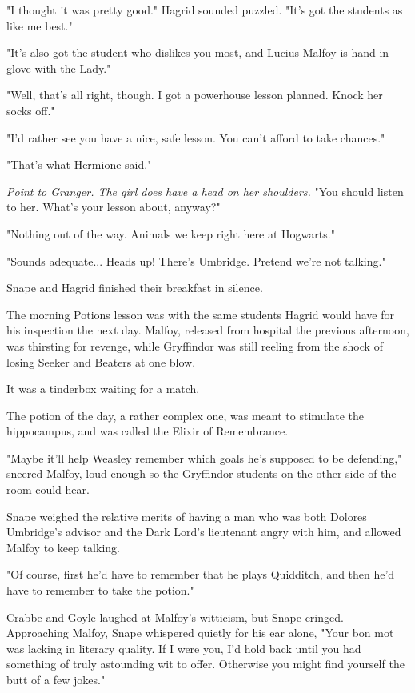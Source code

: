"I thought it was pretty good." Hagrid sounded puzzled. "It's got the students as like me best."

"It's also got the student who dislikes you most, and Lucius Malfoy is hand in glove with the Lady."

"Well, that's all right, though. I got a powerhouse lesson planned. Knock her socks off."

"I'd rather see you have a nice, safe lesson. You can't afford to take chances."

"That's what Hermione said."

\emph{Point to Granger. The girl does have a head on her shoulders.} "You should listen to her. What's your lesson about, anyway?"

"Nothing out of the way. Animals we keep right here at Hogwarts."

"Sounds adequate... Heads up! There's Umbridge. Pretend we're not talking."

Snape and Hagrid finished their breakfast in silence.

The morning Potions lesson was with the same students Hagrid would have for his inspection the next day. Malfoy, released from hospital the previous afternoon, was thirsting for revenge, while Gryffindor was still reeling from the shock of losing Seeker and Beaters at one blow.

It was a tinderbox waiting for a match.

The potion of the day, a rather complex one, was meant to stimulate the hippocampus, and was called the Elixir of Remembrance.

"Maybe it'll help Weasley remember which goals he's supposed to be defending," sneered Malfoy, loud enough so the Gryffindor students on the other side of the room could hear.

Snape weighed the relative merits of having a man who was both Dolores Umbridge's advisor and the Dark Lord's lieutenant angry with him, and allowed Malfoy to keep talking.

"Of course, first he'd have to remember that he plays Quidditch, and then he'd have to remember to take the potion."

Crabbe and Goyle laughed at Malfoy's witticism, but Snape cringed. Approaching Malfoy, Snape whispered quietly for his ear alone, "Your bon mot was lacking in literary quality. If I were you, I'd hold back until you had something of truly astounding wit to offer. Otherwise you might find yourself the butt of a few jokes."

